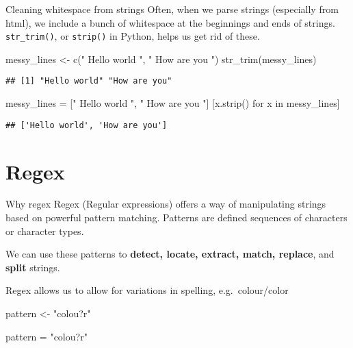 \documentclass[
  10pt,
  ignorenonframetext,
  aspectratio=169]{beamer}
\newenvironment{Shaded}{\begin{snugshade}}{\end{snugshade}}
\newcommand{\ControlFlowTok}[1]{\textcolor[rgb]{0.94,0.87,0.69}{#1}}
\newcommand{\FunctionTok}[1]{\textcolor[rgb]{0.94,0.94,0.56}{#1}}
\newcommand{\KeywordTok}[1]{\textcolor[rgb]{0.94,0.87,0.69}{#1}}
\newcommand{\NormalTok}[1]{\textcolor[rgb]{0.80,0.80,0.80}{#1}}
\newcommand{\OperatorTok}[1]{\textcolor[rgb]{0.94,0.94,0.82}{#1}}
\newcommand{\OtherTok}[1]{\textcolor[rgb]{0.94,0.94,0.56}{#1}}
\newcommand{\StringTok}[1]{\textcolor[rgb]{0.80,0.58,0.58}{#1}}
\begin{document}
\begin{frame}[fragile]{Cleaning whitespace from strings}
\protect\hypertarget{cleaning-whitespace-from-strings}{}
Often, when we parse strings (especially from html), we include a bunch
of whitespace at the beginnings and ends of strings.
\texttt{str\_trim()}, or \texttt{strip()} in Python, helps us get rid of
these.

\begin{Shaded}
\begin{Highlighting}[]
\NormalTok{messy\_lines }\OtherTok{\textless{}{-}} \FunctionTok{c}\NormalTok{(}\StringTok{" Hello world   "}\NormalTok{, }\StringTok{" How are you "}\NormalTok{)}
\FunctionTok{str\_trim}\NormalTok{(messy\_lines)}
\end{Highlighting}
\end{Shaded}

\begin{verbatim}
## [1] "Hello world" "How are you"
\end{verbatim}

\begin{Shaded}
\begin{Highlighting}[]
\NormalTok{messy\_lines }\OperatorTok{=}\NormalTok{ [}\StringTok{" Hello world   "}\NormalTok{, }\StringTok{" How are you "}\NormalTok{]}
\NormalTok{[x.strip() }\ControlFlowTok{for}\NormalTok{ x }\KeywordTok{in}\NormalTok{ messy\_lines]}
\end{Highlighting}
\end{Shaded}

\begin{verbatim}
## ['Hello world', 'How are you']
\end{verbatim}
\end{frame}

\hypertarget{regex}{%
\section{Regex}\label{regex}}

\begin{frame}[fragile]{Why regex}
\protect\hypertarget{why-regex}{}
Regex (Regular expressions) offers a way of manipulating strings based
on powerful pattern matching. Patterns are defined sequences of
characters or character types.

We can use these patterns to \textbf{detect, locate, extract, match,
replace}, and \textbf{split} strings.

Regex allows us to allow for variations in spelling, e.g.~colour/color

\begin{Shaded}
\begin{Highlighting}[]
\NormalTok{pattern }\OtherTok{\textless{}{-}} \StringTok{"colou?r"}
\end{Highlighting}
\end{Shaded}

\begin{Shaded}
\begin{Highlighting}[]
\NormalTok{pattern }\OperatorTok{=} \StringTok{"colou?r"}
\end{Highlighting}
\end{Shaded}
\end{frame}
\end{document}
